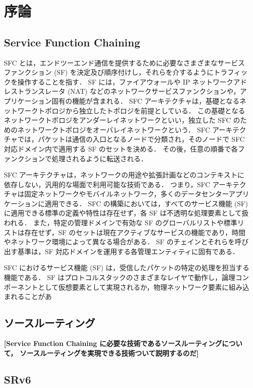\chapter{序論}
\label{chap:introduction}
\section{Service Function Chaining}

SFC とは，エンドツーエンド通信を提供するために必要なさまざまなサービスファンクション (SF) を決定及び順序付けし，それらを介するようにトラフィックを操作することを指す．
SF には，ファイアウォールや IP ネットワークアドレストランスレータ (NAT) などのネットワークサービスファンクションや，アプリケーション固有の機能が含まれる．
SFC アーキテクチャは，基礎となるネットワークトポロジから独立したトポロジを前提としている．
この基礎となるネットワークトポロジをアンダーレイネットワークといい，独立した SFC のためのネットワークトポロジをオーバレイネットワークという．
SFC アーキテクチャでは，パケットは通信の入口となるノードで分類され，そのノードで SFC 対応ドメイン内で適用する SF のセットを決める．
その後，任意の順番で各ファンクションで処理されるように転送される．

SFC アーキテクチャは，ネットワークの用途や拡張計画などのコンテキストに依存しない，汎用的な場面で利用可能な技術である．
つまり，SFC アーキテクチャは固定ネットワークやモバイルネットワーク，多くのデータセンターアプリケーションに適用できる．
SFC の構築においては，すべてのサービス機能 (SF) に適用できる標準の定義や特性は存在せず，各 SF は不透明な処理要素として扱われる．
また，特定の管理ドメインで有効な SF のグローバルリストや標準リストは存在せず，SF のセットは現在アクティブなサービスの機能であり，時間やネットワーク環境によって異なる場合がある．
SF のチェインとそれらを呼び出す基準は，SF 対応ドメインを運用する各管理エンティティに固有である．

SFC におけるサービス機能 (SF) は，受信したパケットの特定の処理を担当する機能である．
SF はプロトコルスタックのさまざまなレイヤで動作し，論理コンポーネントとして仮想要素として実現されるか，物理ネットワーク要素に組み込まれることがあ

\section{ソースルーティング}
\textbf{[Service Function Chaining に必要な技術であるソースルーティングについて， ソースルーティングを実現できる技術ついて説明するのだ]}

\section{SRv6}
\label{section:srv6}

